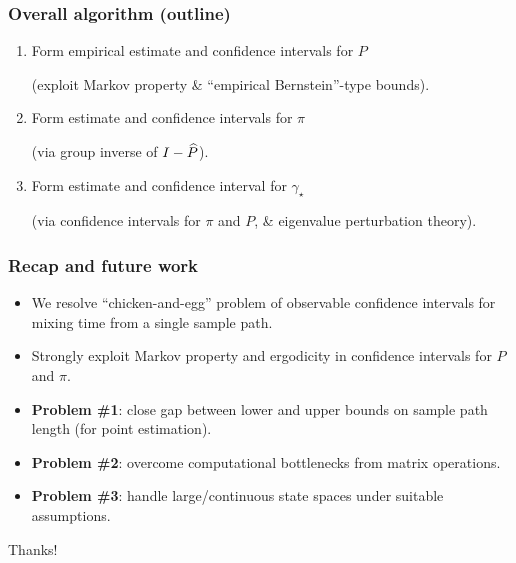 \documentclass[11pt,compress,blue4]{beamer}
\newcommand\fns\footnotesize
\newcommand\gap{\ensuremath{\gamma_{\star}}}
\begin{document}
\begin{frame}
  \frametitle{Overall algorithm (outline)}

  \begin{enumerate}
    \item
      Form empirical estimate and confidence intervals for $P$

      {\fns(exploit Markov property \& ``empirical Bernstein''-type bounds)}.

      \medskip

    \item
      Form estimate and confidence intervals for $\pi$

      {\fns(via group inverse of $I - \widehat P$)}.

      \medskip

    \item
      Form estimate and confidence interval for $\gap$

      {\fns(via confidence intervals for $\pi$ and $P$, \& eigenvalue perturbation theory)}.

  \end{enumerate}
\end{frame}


\begin{frame}
  \frametitle{Recap and future work}

  \begin{itemize}
    \item
      We resolve ``chicken-and-egg'' problem of observable
      confidence intervals for mixing time from a single sample path.

    \item
      Strongly exploit Markov property and ergodicity in confidence
      intervals for $P$ and $\pi$.

    \item
      \textbf{Problem \#1}:
      close gap between lower and upper bounds on sample path length
      (for point estimation).

    \item
      \textbf{Problem \#2}:
      overcome computational bottlenecks from matrix operations.

    \item
      \textbf{Problem \#3}:
      handle large/continuous state spaces under suitable assumptions.

  \end{itemize}

\end{frame}


\begin{frame}
  \begin{center}
    \Huge
    Thanks!
  \end{center}
\end{frame}

\end{document}
